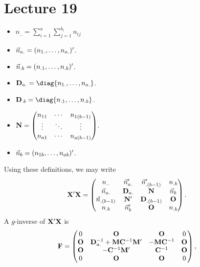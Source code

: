 \section{Lecture 19}
\begin{itemize}
    \item $ n_{..}=\sum_{i=1}^{a}\sum_{j=1}^{b_i} n_{ij} $
    \item $ \vec{n}_{a.}=(n_{1.},\ldots,n_{a.})' $.
    \item $ \vec{n}_{.b}=(n_{.1},\ldots,n_{.b})' $.
    \item $ \Matrix{D}_{a.}=\diag{n_{1.},\ldots,n_{a.}} $.
    \item $ \Matrix{D}_{.b}=\diag{n_{.1},\ldots,n_{.b}} $.
    \item $ \mathbf{N}=\begin{pmatrix}
                  n_{11} & \cdots & n_{1(b-1)} \\
                  \vdots & \ddots & \vdots     \\
                  n_{a1} & \cdots & n_{a(b-1)}
              \end{pmatrix} $.
    \item $ \vec{n}_{b}=(n_{1b},\ldots,n_{ab})' $.
\end{itemize}
Using these definitions, we may write
\[ \mathbf{X}'\mathbf{X}=\begin{pmatrix}
        n_{..}              & \vec{n}_{a.}' & \vec{n}_{.(b-1)}' & n_{.b}       \\
        \vec{n}_{a.}     & \mathbf{D}_{a.}  & \mathbf{N}           & \vec{n}_b \\
        \vec{n}_{.(b-1)} & \mathbf{N}'      & \mathbf{D}_{.(b-1)}  & \mathbf{O}   \\
        n_{.b}              & \vec{n}_{b}'  & \mathbf{O}           & n_{.b}
    \end{pmatrix}. \]
A $ g $-inverse of $ \mathbf{X}'\mathbf{X} $ is
\[ \mathbf{F}=\begin{pmatrix}
        0          & \mathbf{O}                                                & \mathbf{O}                 & 0          \\
        \mathbf{O} & \mathbf{D}_{a.}^{-1}+\mathbf{M}\mathbf{C}^{-1}\mathbf{M}' & -\mathbf{M}\mathbf{C}^{-1} & \mathbf{O} \\
        \mathbf{O} & -\mathbf{C}^{-1}\mathbf{M}'                               & \mathbf{C}^{-1}            & \mathbf{O} \\
        0          & \mathbf{O}                                                & \mathbf{O}                 & 0          \\
    \end{pmatrix}, \]

